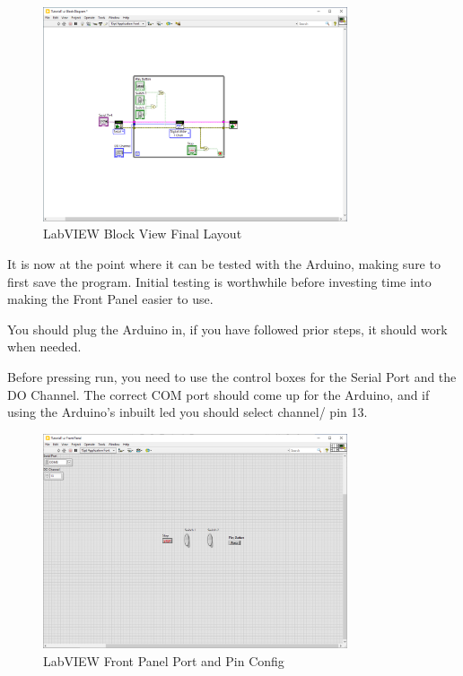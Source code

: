 \documentclass[a4paper,11pt]{report}
\begin{document}
\begin{figure}[H]
\centering
\includegraphics[width=0.8\textwidth]{screenshots/labview28}
\caption{LabVIEW Block View Final Layout}
\end{figure}

It is now at the point where it can be tested with the Arduino, making sure to first save the program. Initial testing is worthwhile before investing time into making the Front Panel easier to use.

You should plug the Arduino in, if you have followed prior steps, it should work when needed.

Before pressing run, you need to use the control boxes for the Serial Port and the DO Channel. The correct COM port should come up for the Arduino, and if using the Arduino's inbuilt \gls{led} you should select channel/ pin 13.

\begin{figure}[H]
\centering
\includegraphics[width=0.8\textwidth]{screenshots/labview29}
\caption{LabVIEW Front Panel Port and Pin Config}
\end{figure}
\end{document}

